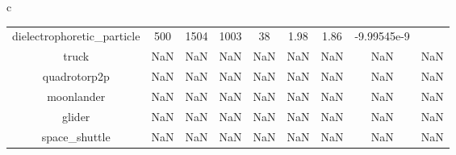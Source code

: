 \documentclass{standalone}
\begin{document}
\begin{tabular}{c}
\begin{tabular}{ccccccccc}
  dielectrophoretic\_particle & 500 & 1504 & 1003 & 38 & 1.98 & 1.86 & -9.99545e-9 & \color{red}{Infeasible Problem} \\
  truck & NaN & NaN & NaN & NaN & NaN & NaN & NaN & NaN \\
  quadrotorp2p & NaN & NaN & NaN & NaN & NaN & NaN & NaN & NaN \\
  moonlander & NaN & NaN & NaN & NaN & NaN & NaN & NaN & NaN \\
  glider & NaN & NaN & NaN & NaN & NaN & NaN & NaN & NaN \\
  space\_shuttle & NaN & NaN & NaN & NaN & NaN & NaN & NaN & NaN \\\hline
\end{tabular}
\end{tabular}
\end{document}
